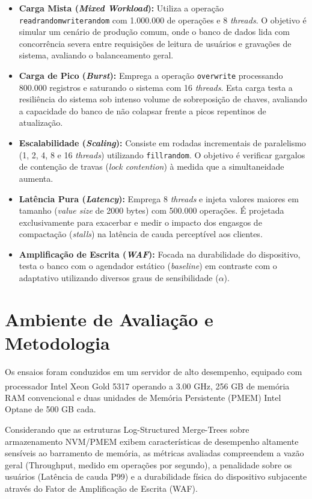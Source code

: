 \begin{itemize}
    \item \textbf{Carga Mista (\textit{Mixed Workload}):} Utiliza a operação \texttt{readrandomwriterandom} com 1.000.000 de operações e 8 \textit{threads}. O objetivo é simular um cenário de produção comum, onde o banco de dados lida com concorrência severa entre requisições de leitura de usuários e gravações de sistema, avaliando o balanceamento geral.
    \item \textbf{Carga de Pico (\textit{Burst}):} Emprega a operação \texttt{overwrite} processando 800.000 registros e saturando o sistema com 16 \textit{threads}. Esta carga testa a resiliência do sistema sob intenso volume de sobreposição de chaves, avaliando a capacidade do banco de não colapsar frente a picos repentinos de atualização.
    \item \textbf{Escalabilidade (\textit{Scaling}):} Consiste em rodadas incrementais de paralelismo (1, 2, 4, 8 e 16 \textit{threads}) utilizando \texttt{fillrandom}. O objetivo é verificar gargalos de contenção de travas (\textit{lock contention}) à medida que a simultaneidade aumenta.
    \item \textbf{Latência Pura (\textit{Latency}):} Emprega 8 \textit{threads} e injeta valores maiores em tamanho (\textit{value size} de 2000 bytes) com 500.000 operações. É projetada exclusivamente para exacerbar e medir o impacto dos engasgos de compactação (\textit{stalls}) na latência de cauda perceptível aos clientes.
    \item \textbf{Amplificação de Escrita (\textit{WAF}):} Focada na durabilidade do dispositivo, testa o banco com o agendador estático (\textit{baseline}) em contraste com o adaptativo utilizando diversos graus de sensibilidade ($\alpha$). 
\end{itemize}

\section{Ambiente de Avaliação e Metodologia}\label{sec:ambiente}
Os ensaios foram conduzidos em um servidor de alto desempenho, equipado com processador Intel\textsuperscript{\textregistered} Xeon\textsuperscript{\textregistered} Gold 5317 operando a 3.00 GHz, 256 GB de memória RAM convencional e duas unidades de Memória Persistente (PMEM) Intel Optane de 500 GB cada. 

Considerando que as estruturas Log-Structured Merge-Trees sobre armazenamento NVM/PMEM exibem características de desempenho altamente sensíveis ao barramento de memória, as métricas avaliadas compreendem a vazão geral (Throughput, medido em operações por segundo), a penalidade sobre os usuários (Latência de cauda P99) e a durabilidade física do dispositivo subjacente através do Fator de Amplificação de Escrita (WAF). 

